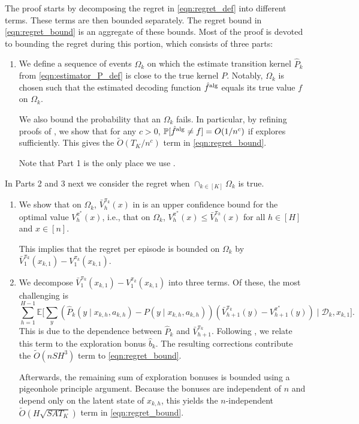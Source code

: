 \documentclass[11pt]{article}
\newcommand{\mcD}{\mathcal{D}}
\newcommand{\mbbP}{\mathbb{P}}
\newcommand{\mbbE}{\mathbb{E}}
\newcommand{\alg}{\textnormal{alg}}
\theoremstyle{definition}
\theoremstyle{definition}
\begin{document}
The proof starts by decomposing the regret in \eqref{eqn:regret_def} into different terms.
These terms are then bounded separately.
The regret bound in \eqref{eqn:regret_bound} is an aggregate of these bounds.
Most of the proof is devoted to bounding the regret during this portion, which consists of three parts:

\begin{enumerate}
	\item[Part 1.]
	      We define a sequence of events $\Omega_k$ on which the estimate transition kernel $\hat{P}_k$ from \eqref{eqn:estimator_P_def} is close to the true kernel $P$.
	      Notably, $\Omega_k$ is chosen such that the estimated decoding function $\hat{f}^{\alg}$ equals its true value $f$ on $\Omega_k$.

	      We also bound the probability that an $\Omega_k$ fails.
	      In particular, by refining proofs of \cite{Jedra:2022}, we show that for any $c>0$, $\mbbP[\hat{f}^{\alg}\neq f]=O(1/n^c)$ if  explores sufficiently.
	      This gives the $\tilde{O}(T_K/n^c)$ term in \eqref{eqn:regret_bound}.
		  
		  Note that Part 1 is the only place we use .
\end{enumerate}

In Parts 2 and 3 next we consider the regret when $\cap_{k\in[K]}\Omega_k$ is true.

\begin{enumerate}
	\item[Part 2.]
	      We show that on $\Omega_k$, $\bar{V}^{\pi_k}_{h}(x)$ in  is an upper confidence bound for the optimal value $V^{\pi^*}_h(x)$, i.e., that on $\Omega_k$, $V^{\pi^*}_h(x)\leq \bar{V}^{\pi_k}_{h}(x)$ for all $h\in[H]$ and $x\in[n]$.
		  

	      This implies that the regret per episode is bounded on $\Omega_k$ by $\bar{V}^{\pi_k}_1(x_{k,1})-V^{\pi_k}_1(x_{k,1})$.

	\item[Part 3.]
	      We decompose
		  $\bar{V}^{\pi_k}_1(x_{k,1})-V^{\pi_k}_1(x_{k,1})$ into three terms.
		  Of these, the most challenging is
		  \begin{equation}
			\sum_{h=1}^{H-1}\mbbE\biggl[
				\sum_{y}
				(
					\hat{P}_k(y\mid x_{k,h},a_{k,h})-P(y\mid x_{k,h},a_{k,h})
				)
				(
					\bar{V}^{\pi_k}_{h+1}(y)-V^{\pi^*}_{h+1}(y)
				)
				\mid \mcD_k, x_{k,1}
			\biggr]
			.
			\label{eqn:outline_simulation_lemma_bound}
		  \end{equation}
	      This is due to the dependence between $\hat{P}_k$ and $\bar{V}^{\pi_k}_{h+1}$.
	      Following \cite{UCRLVI}, we relate this term to the exploration bonus $\hat{b}_k$.
		  The resulting corrections contribute the $\tilde{O}(nSH^3)$ term to \eqref{eqn:regret_bound}.

	      Afterwards, the remaining sum of exploration bonuses is bounded using a pigeonhole principle argument.
	      Because the bonuses are independent of $n$ and depend only on the latent state of $x_{k,h}$, this yields the $n$-independent $\tilde{O}(H\sqrt{SAT_K})$ term in \eqref{eqn:regret_bound}.
\end{enumerate}
\end{document}

